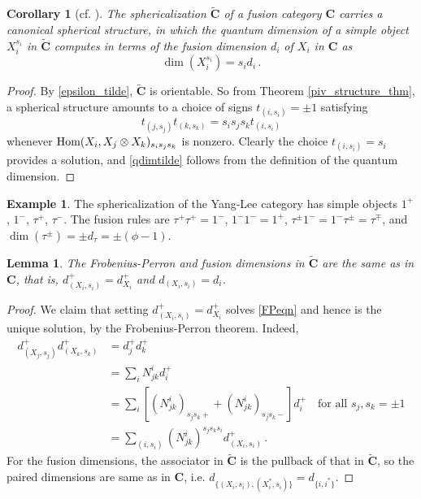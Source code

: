 \documentclass[a4paper]{article}
\theoremstyle{plain}
\newtheorem{cor}[thm]{Corollary}
\newtheorem{lem}[thm]{Lemma}
\theoremstyle{definition}
\newtheorem{example}[thm]{Example}
\newcommand{\Hom}{\operatorname{\text{\rm Hom}}}
\newcommand{\cat}{\mathbf}
\begin{document}
\begin{cor}[{cf. \cite[Prop 5.14]{eno02-ofc}}] The sphericalization $\tilde{\cat{C}}$ of a fusion category $\cat{C}$ carries a canonical spherical structure, in which the quantum dimension of a simple object $X^{s_i}_i$ in $\tilde{\cat{C}}$ computes in terms of the fusion dimension $d_i$ of $X_i$ in $\cat{C}$ as \label{spher_cor}
\begin{equation} \label{qdimtilde}
\dim (X^{s_i}_i) = s_i d_i \, .
\end{equation}
\end{cor}
\begin{proof}
By \eqref{epsilon_tilde}, $\tilde{\cat{C}}$ is orientable. So from Theorem \ref{piv_structure_thm}, a spherical structure amounts to a choice of signs $t_{(i, s_i)} = \pm 1$ satisfying 
\[
t_{(j, s_j)} t_{(k, s_k)} = s_i s_j s_k t_{(i, s_i)}
\]
whenever $\Hom(X_i, X_j \otimes X_k)_{s_i s_j s_k}$ is nonzero. Clearly the choice $t_{(i, s_i)} = s_i$ provides a solution, and \eqref{qdimtilde} follows from the definition of the quantum dimension.
\end{proof}
\begin{example} The sphericalization of the Yang-Lee category has simple objects $1^+$, $1^-$, $\tau^+$, $\tau^-$. The fusion rules are $\tau^+ \tau^+ = 1^-$, $1^- 1^- = 1^+$, $\tau^{\pm} 1^- = 1^- \tau^{\pm} = \tau^{\mp}$, and $\dim (\tau^{\pm}) = \pm d_\tau = \pm (\phi - 1)$.
\end{example}
\begin{lem} The Frobenius-Perron and fusion dimensions in $\tilde{\cat{C}}$ are the same as in $\cat{C}$, that is, $d^+_{(X_i, s_i)} = d^+_{X_i}$ and $d_{(X_i, s_i)} = d_i$. \label{sphericalization_dim}
\end{lem}
\begin{proof} We claim that setting $d^+_{(X_i, s_i)} = d^+_{X_i}$ solves \eqref{FPeqn} and hence is the unique solution, by the Frobenius-Perron theorem. Indeed,
\begin{align*}
 d^+_{(X_j, s_j)} d^+_{(X_k, s_k)} &= d^+_j d^+_k \\ 
  &= \sum_i N^i_{jk} d^+_i \\
  &= \sum_i \left[ (N^i_{jk})_{s_j s_k +} + (N^i_{jk})_{s_j s_k -}  \right] d^+_i \quad \text{for all $s_j,s_k = \pm 1$} \\
  &= \sum_{(i, s_i)} (N^i_{jk})^{s_j s_k s_i} d^+_{(X_i, s_i)} \, .
\end{align*}
For the fusion dimensions, the associator in $\tilde{\cat{C}}$ is the pullback of that in $\tilde{\cat{C}}$, so the paired dimensions are same as in $\cat{C}$, i.e. $d_{\{(X_i, s_i), (X_i^*, s_i)\}} = d_{\{i, i^*\}}$. 
\end{proof}
\end{document}
